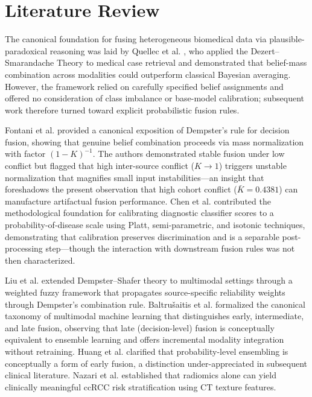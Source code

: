 \section{Literature Review}
\label{sec:lit_review}

The canonical foundation for fusing heterogeneous biomedical data via plausible-paradoxical reasoning was laid by Quellec et al. \cite{quellec2010dezert}, who applied the Dezert--Smarandache Theory to medical case retrieval and demonstrated that belief-mass combination across modalities could outperform classical Bayesian averaging. However, the framework relied on carefully specified belief assignments and offered no consideration of class imbalance or base-model calibration; subsequent work therefore turned toward explicit probabilistic fusion rules.

Fontani et al. \cite{fontani2013dempster} provided a canonical exposition of Dempster's rule for decision fusion, showing that genuine belief combination proceeds via mass normalization with factor $(1-K)^{-1}$. The authors demonstrated stable fusion under low conflict but flagged that high inter-source conflict ($K \to 1$) triggers unstable normalization that magnifies small input instabilities---an insight that foreshadows the present observation that high cohort conflict ($\bar{K} = 0.4381$) can manufacture artifactual fusion performance. Chen et al. \cite{chen2016calibrating} contributed the methodological foundation for calibrating diagnostic classifier scores to a probability-of-disease scale using Platt, semi-parametric, and isotonic techniques, demonstrating that calibration preserves discrimination and is a separable post-processing step---though the interaction with downstream fusion rules was not then characterized.

Liu et al. \cite{liu2017weighted} extended Dempster--Shafer theory to multimodal settings through a weighted fuzzy framework that propagates source-specific reliability weights through Dempster's combination rule. Baltru{\v{s}}aitis et al. \cite{baltrusaitis2018multimodal} formalized the canonical taxonomy of multimodal machine learning that distinguishes early, intermediate, and late fusion, observing that late (decision-level) fusion is conceptually equivalent to ensemble learning and offers incremental modality integration without retraining. Huang et al. \cite{huang2020fusion} clarified that probability-level ensembling is conceptually a form of early fusion, a distinction under-appreciated in subsequent clinical literature. Nazari et al. \cite{nazari2020ct} established that radiomics alone can yield clinically meaningful ccRCC risk stratification using CT texture features.

